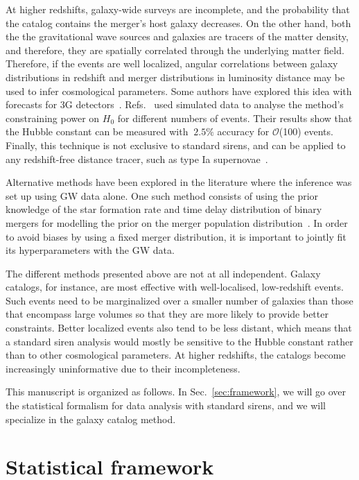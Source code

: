 \documentclass[%
preprint,
nofootinbib,
 amsmath,amssymb,
 aps,
]{revtex4-2}
\begin{document}
At higher redshifts, galaxy-wide surveys are incomplete, and the probability that the catalog
contains the merger's host galaxy decreases. On the other hand, both the the gravitational wave
sources and galaxies are tracers of the matter density, and therefore, they are spatially
correlated through the underlying matter field. Therefore, if the events are well localized,
angular correlations between galaxy distributions in redshift and merger distributions in
luminosity distance may be used to infer cosmological parameters. Some authors have explored this
idea with forecasts for 3G detectors~\cite{Oguri_2016}. Refs.~
used simulated data to analyse the method's constraining power on $H_0$ for different numbers of
events. Their results show that the Hubble constant can be measured with $~ 2.5\%$ accuracy for
$\mathcal{O}$(100) events. Finally, this technique is not exclusive to standard sirens, and can be
applied to any redshift-free distance tracer, such as type Ia
supernovae~\cite{mukherjee2018classical}.

Alternative methods have been explored in the literature where the inference was set up using GW
data alone. One such method consists of using the prior knowledge of the star formation rate and
time delay distribution of binary mergers for modelling the prior on the merger population
distribution~\cite{Ding_2019, Ye_2021, Leandro_2022}. In order to avoid biases by using a fixed
merger distribution, it is important to jointly fit its hyperparameters with the GW data.

The different methods presented above are not at all independent. Galaxy catalogs, for instance,
are most effective with well-localised, low-redshift events. Such events need to be marginalized
over a smaller number of galaxies than those that encompass large volumes so that they are more
likely to provide better constraints. Better localized events also tend to be less distant, which
means that a standard siren analysis would mostly be sensitive to the Hubble constant rather than
to other cosmological parameters. At higher redshifts, the catalogs become increasingly
uninformative due to their incompleteness.

This manuscript is organized as follows. In Sec.~\ref{sec:framework}, we will go over the
statistical formalism for data analysis with standard sirens, and we will specialize in the galaxy
catalog method.

\section{\label{sec:framework}Statistical framework}
\end{document}
